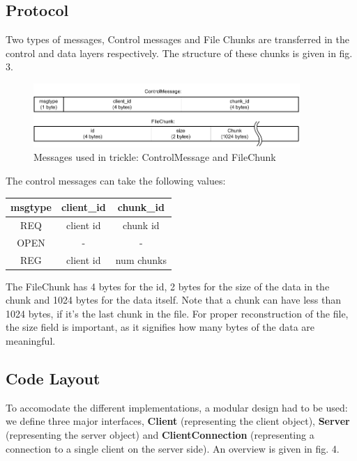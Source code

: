 \documentclass[12pt]{article}
\newcommand\la{\textlangle\xspace}  %
\newcommand\ra{\textrangle\xspace}
\begin{document}
\subsection{Protocol}

Two types of messages, Control messages and File Chunks are transferred in the control and data layers respectively. The structure of these chunks is given in fig. 3.

\begin{figure}[H]
  \centering
  \includegraphics[width=0.9\textwidth]{messages.pdf}
  \caption{Messages used in trickle: ControlMessage and FileChunk}
\end{figure}

The control messages can take the following values:
\begin{center}
\begin{tabular}{|c|c|c|}
\hline
msgtype & client\_id & chunk\_id \\
\hline
REQ     & \la client id \ra & \la chunk id \ra \\
OPEN    &     -     &     -    \\
REG     & \la client id \ra & \la num chunks \ra \\
\hline
\end{tabular}
\end{center}

The FileChunk has 4 bytes for the id, 2 bytes for the size of the data in the chunk and 1024 bytes for the data itself. Note that a chunk can have less than 1024 bytes, if it's the last chunk in the file. For proper reconstruction of the file, the size field is important, as it signifies how many bytes of the data are meaningful.

\subsection{Code Layout}

To accomodate the different implementations, a modular design had to be used: we define three major interfaces, \textbf{Client} (representing the client object), \textbf{Server} (representing the server object) and \textbf{ClientConnection} (representing a connection to a single client on the server side). An overview is given in fig. 4.
\end{document}
